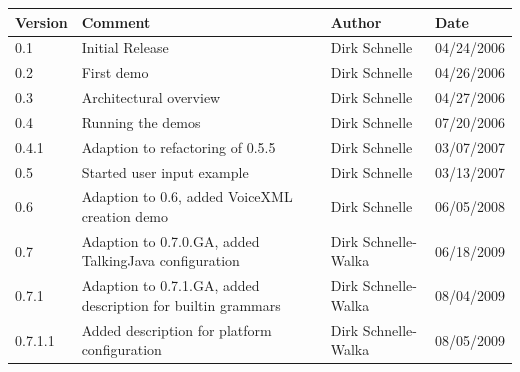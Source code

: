 \documentclass[11pt,a4paper]{article}
\begin{document}
\begin{tabular}{|l|p{5cm}|l|l|}
\hline
\textbf{Version} & \textbf{Comment} & \textbf{Author} & \textbf{Date} \\
\hline
\hline
0.1 & Initial Release & Dirk Schnelle & 04/24/2006 \\
\hline
0.2 & First demo & Dirk Schnelle & 04/26/2006 \\
\hline
0.3 & Architectural overview & Dirk Schnelle & 04/27/2006 \\
\hline
0.4 & Running the demos & Dirk Schnelle & 07/20/2006 \\
\hline
0.4.1 & Adaption to refactoring of 0.5.5 & Dirk Schnelle & 03/07/2007 \\
\hline
0.5 & Started user input example & Dirk Schnelle & 03/13/2007 \\
\hline
0.6 & Adaption to 0.6, added VoiceXML creation demo 
    & Dirk Schnelle & 06/05/2008 \\
\hline
0.7 & Adaption to 0.7.0.GA, added TalkingJava configuration 
    & Dirk Schnelle-Walka & 06/18/2009 \\
\hline
0.7.1 & Adaption to 0.7.1.GA, added description for builtin grammars 
    & Dirk Schnelle-Walka & 08/04/2009 \\
\hline
0.7.1.1 & Added description for platform configuration 
    & Dirk Schnelle-Walka & 08/05/2009 \\
\hline
\end{tabular}



\end{document}
